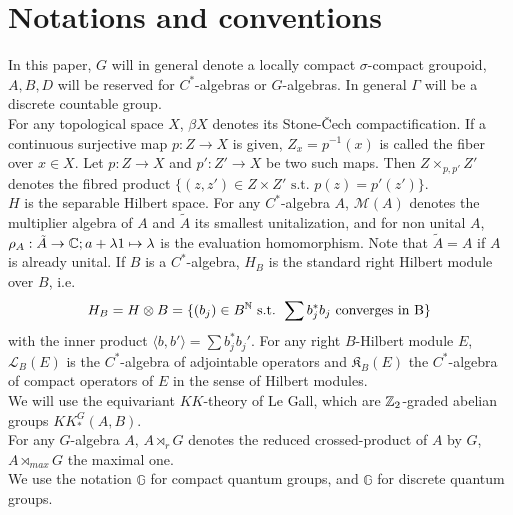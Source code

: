 \section*{Notations and conventions}

In this paper, $G$ will in general denote a locally compact $\sigma$-compact groupoid, $A,B,D$ will be reserved for $C^*$-algebras or $G$-algebras. In general $\Gamma$ will be a discrete countable group.\\

For any topological space $X$, $\beta X$ denotes its Stone-\v{C}ech compactification. If a continuous surjective map $p : Z\rightarrow X $ is given, $Z_x = p^{-1}(x)$ is called the fiber over $x\in X$. Let $p : Z\rightarrow X $ and $p' : Z'\rightarrow X $ be two such maps. Then $Z\times_{p,p'} Z'$ denotes the fibred product $\{(z,z')\in Z\times Z' \text{ s.t. } p(z)=p'(z')\}$. \\ 

$H$ is the separable Hilbert space. For any $C^*$-algebra $A$, $\mathcal M(A)$ denotes the multiplier algebra of $A$ and $\tilde A$ its smallest unitalization, and for non unital $A$, $\rho_A : \tilde A \rightarrow \mathbb C; a+\lambda 1 \mapsto \lambda$ is the evaluation homomorphism. Note that $\tilde A=A$ if $A$ is already unital. If $B$ is a $C^*$-algebra, $H_B$ is the standard right Hilbert module over $B$, i.e. \[H_B= H\otimes B=\{(b_j)\in B^\mathbb N \text{ s.t. }\sum b_j^* b_j \text{ converges in B}\}\] with the inner product $\langle b, b'\rangle = \sum b_j^* b_j'$. For any right $B$-Hilbert module $E$, $\mathcal L_B(E)$ is the $C^*$-algebra of adjointable operators and $\mathfrak K_B(E)$ the $C^*$-algebra of compact operators of $E$ in the sense of Hilbert modules.\\

We will use the equivariant $KK$-theory of Le Gall, which are $\mathbb Z_2$-graded abelian groups $KK^G_*(A,B)$.\\

For any $G$-algebra $A$, $A\rtimes_r G$ denotes the reduced crossed-product of $A$ by $G$, $A\rtimes_{max} G$ the maximal one. \\

We use the notation $\mathbb G$ for compact quantum groups, and $\hat{\mathbb G}$ for discrete quantum groups. 
